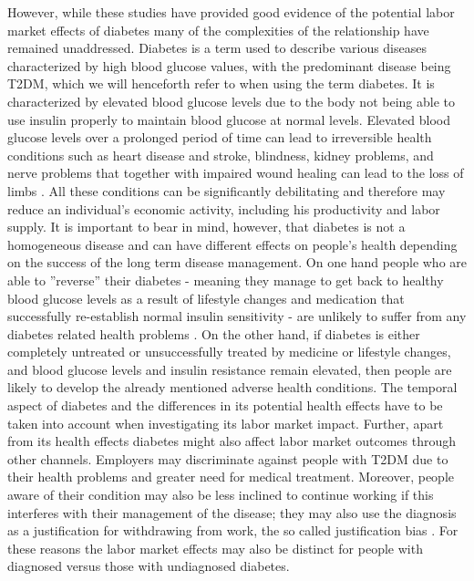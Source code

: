 \documentclass[12pt,english,british]{article}
\begin{document}
However, while these studies have provided good evidence of the potential labor market effects of diabetes many of the complexities of the relationship have remained unaddressed. Diabetes is a term used to describe  various diseases characterized by high blood glucose values, with the predominant disease being \ac{T2DM}, which we will henceforth refer to when using the term diabetes. It is characterized by elevated blood glucose levels due to the body not being able to use insulin properly to maintain blood glucose at normal levels. Elevated blood glucose levels over a prolonged period of time can lead to irreversible health conditions such as heart disease and stroke, blindness, kidney problems, and nerve problems that together with impaired wound healing can lead to the loss of limbs \citep{Reynoso-Noveron2011}. All these conditions can be significantly debilitating and therefore may reduce an individual's economic activity, including his productivity and labor supply. It is important to bear in mind, however, that diabetes is not a homogeneous
disease and can have different effects on people's health depending
on the success of the long term disease management. On one hand people
who are able to ''reverse'' their diabetes - meaning they manage
to get back to healthy blood glucose levels as a result of lifestyle
changes and medication that successfully re-establish normal insulin sensitivity -
are unlikely to suffer from any diabetes related health problems \citep{Lim2011, Gregg2012}.
On the other hand, if diabetes is either completely untreated or unsuccessfully
treated by medicine or lifestyle changes, and blood glucose levels
and insulin resistance remain elevated, then people are likely to develop the already mentioned adverse health conditions. The temporal aspect of diabetes and the differences in its potential health effects have to be taken into account when investigating its labor market impact. Further, apart from its health effects diabetes might also affect labor market outcomes through other channels. Employers may discriminate against
people with \ac{T2DM} due to their health problems and greater
need for medical treatment. Moreover, people aware of their condition
may also be less inclined to continue working if this interferes with
their management of the disease; they may also use the diagnosis as a justification for withdrawing from work, the so called justification bias \citep{Kapteyn2009}. For these reasons the labor
market effects may also be distinct for people with diagnosed versus those
with undiagnosed diabetes. 
\end{document}
